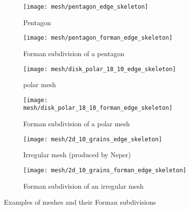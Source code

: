 \begin{figure}[!ht]
  \begin{subfigure}{.45\textwidth}
    \centering
    \texttt{[image: mesh/pentagon\_edge\_skeleton]}
    \caption{Pentagon}
  \end{subfigure}
  \begin{subfigure}{.45\textwidth}
    \centering
    \texttt{[image: mesh/pentagon\_forman\_edge\_skeleton]}
    \caption{Forman subdivision of a pentagon}
  \end{subfigure}

  \begin{subfigure}{.45\textwidth}
    \centering
    \texttt{[image: mesh/disk\_polar\_18\_10\_edge\_skeleton]}
    \caption{polar mesh}
  \end{subfigure}
  \begin{subfigure}{.45\textwidth}
    \centering
    \texttt{[image: mesh/disk\_polar\_18\_10\_forman\_edge\_skeleton]}
    \caption{Forman subdivision of a polar mesh}
  \end{subfigure}

  \begin{subfigure}{.45\textwidth}
    \centering
    \texttt{[image: mesh/2d\_10\_grains\_edge\_skeleton]}
    \caption{Irregular mesh (produced by Neper)}
  \end{subfigure}
  \begin{subfigure}{.45\textwidth}
    \centering
    \texttt{[image: mesh/2d\_10\_grains\_forman\_edge\_skeleton]}
    \caption{Forman subdivision of an irregular mesh}
  \end{subfigure}
  \caption{Examples of meshes and their Forman subdivisions}
  \label{figure:mesh/forman_subdivision_examples}
\end{figure}
